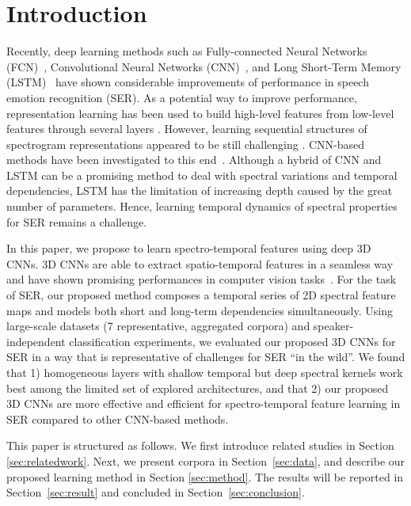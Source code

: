 \documentclass[conference, compsoc, twoside]{IEEEtran}
\begin{document}
\section{Introduction}

Recently, deep learning methods such as Fully-connected Neural Networks (FCN)~\cite{kunHan2014dnn}, Convolutional Neural Networks (CNN)~\cite{zheng2015experimental,mao2014learning}, and Long Short-Term Memory (LSTM)~\cite{trigeorgis2016adieu,lee2015high} have shown considerable improvements of performance in speech emotion recognition (SER). As a potential way to improve performance, representation learning has been used to build high-level features from low-level features through several layers \cite{bengio2013representation,zheng2015experimental,mao2014learning}. However, learning sequential structures of spectrogram representations appeared to be still challenging \cite{ghoshrepresentation2016}. CNN-based methods have been investigated to this end~\cite{zheng2015experimental,mao2014learning,anandconvoluted,trigeorgis2016adieu}. Although a hybrid of CNN and LSTM can be a promising method to deal with spectral variations and temporal dependencies, LSTM has the limitation of increasing depth caused by the great number of parameters. Hence, learning temporal dynamics of spectral properties for SER remains a challenge.

In this paper, we propose to learn spectro-temporal features using deep 3D CNNs. 3D CNNs are able to extract spatio-temporal features in a seamless way and have shown promising performances in computer vision tasks~\cite{ji20133d,tran2015learning}. For the task of SER, our proposed method composes a temporal series of 2D spectral feature maps and models both short and long-term dependencies simultaneously. Using large-scale datasets (7 representative, aggregated corpora) and speaker-independent classification experiments, we evaluated our proposed 3D CNNs for SER in a way that is representative of challenges for SER ``in the wild''. We found that 1) homogeneous layers with shallow temporal but deep spectral kernels work best among the limited set of explored architectures, and that 2) our proposed 3D CNNs are more effective and efficient for spectro-temporal feature learning in SER compared to other CNN-based methods.

This paper is structured as follows. We first introduce related studies in Section \ref{sec:relatedwork}. Next, we present corpora in Section~\ref{sec:data}, and describe our proposed learning method in Section \ref{sec:method}. The results will be reported in Section~\ref{sec:result} and concluded in Section~\ref{sec:conclusion}.
\end{document}

